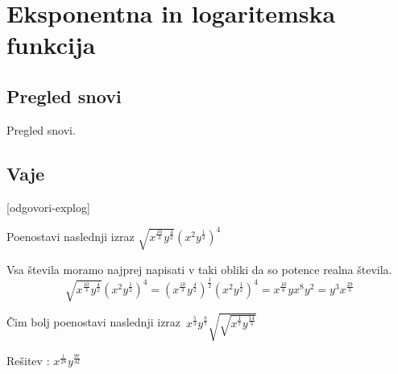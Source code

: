 \chapter{Eksponentna in logaritemska funkcija}
\label{cha:exp-log}

\section{Pregled snovi}
\label{sec:exp-log-pregled-snovi}

Pregled snovi.

\section{Vaje}
\label{sec:exp-log-vaje}


\def\datotekaOdgovori{odgovori-explog}

[\datotekaOdgovori]

%

\begin{vaja}
 Poenostavi naslednji izraz \(\sqrt{x^{\frac{10}{3}}y^{\frac{4}{2}}}(x^{2}y^{\frac{1}{2}})^{4}\)

  \begin{odgovor}
   Vsa števila moramo najprej napisati v taki obliki da so potence realna števila. 
	$$\sqrt{x^{\frac{10}{3}}y^{\frac{4}{2}}}(x^{2}y^{\frac{1}{2}})^{4}=(x^{\frac{10}{3}}y^{\frac{4}{2}})^{\frac{1}{2}}(x^{2}y^{\frac{1}{2}})^{4}=x^{\frac{10}{6}}yx^{8}y^{2}=y^{3}x^{\frac{29}{3}}$$
  \end{odgovor}
\end{vaja}

\begin{vaja}
  Čim bolj poenostavi naslednji izraz \(\,x^{\frac{5}{3}}y^{\frac{8}{7}}\sqrt{\sqrt{x^{\frac{1}{7}}y^{\frac{14}{3}}}}\)

  \begin{odgovor}
   Rešitev : $x^{\frac{1}{28}} y^{\frac{97}{42}}$
  \end{odgovor}
\end{vaja}

